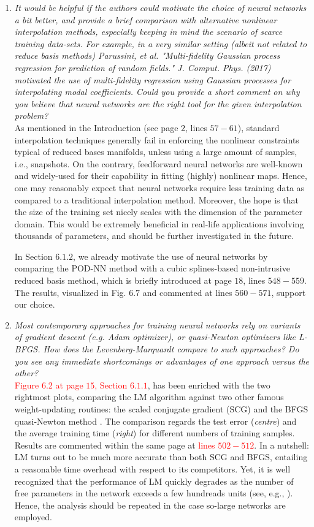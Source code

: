 \documentclass[longtitle]{elsarticle}
\theoremstyle{theorem}
\theoremstyle{definition}
\theoremstyle{remark}
\theoremstyle{proposition}
\numberwithin{figure}{section}
\begin{document}
\begin{enumerate}
			\item \emph{It would be helpful if the authors could motivate the choice of neural networks a bit better, and provide a brief comparison with alternative nonlinear interpolation methods, especially keeping in mind the scenario of scarce training data-sets. For example, in a very similar setting (albeit not related to reduce basis methods) Parussini, et al. "Multi-fidelity Gaussian process regression for prediction of random fields." J. Comput. Phys. (2017) motivated the use of multi-fidelity regression using Gaussian processes for interpolating modal coefficients. Could you provide a short comment on why you believe that neural networks are the right tool for the given interpolation problem?} \\[0.3cm]
			As mentioned in the Introduction (see page $2$, lines $57-61$), standard interpolation techniques generally fail in enforcing the nonlinear constraints typical of reduced bases manifolds, unless using a large amount of samples, i.e., snapshots. On the contrary, feedforward neural networks are well-known and widely-used for their capability in fitting (highly) nonlinear maps. Hence, one may reasonably expect that neural networks require less training data as compared to a traditional interpolation method. Moreover, the hope is that the size of the training set nicely scales with the dimension of the parameter domain. This would be extremely beneficial in real-life applications involving thousands of parameters, and should be further investigated in the future.

			In Section $6.1.2$, we already motivate the use of neural networks by comparing the POD-NN method with a cubic splines-based non-intrusive reduced basis method, which is briefly introduced at page $18$, lines $548-559$. The results, visualized in Fig. $6.7$ and commented at lines $560-571$, support our choice.
			
			\item \emph{Most contemporary approaches for training neural networks rely on variants of gradient descent (e.g. Adam optimizer), or quasi-Newton optimizers like L-BFGS. How does the Levenberg-Marquardt compare to such approaches? Do you see any immediate shortcomings or advantages of one approach versus the other?} \\[0.3cm]
			\textcolor{red}{Figure 6.2 at page $15$, Section $6.1.1$}, has been enriched with the two rightmost plots, comparing the LM algorithm against two other famous weight-updating routines: the scaled conjugate gradient (SCG) \cite{Mol93} and the BFGS quasi-Newton method \cite{GMW81}. The comparison regards the test error (\emph{centre}) and the average training time (\emph{right}) for different numbers of training samples. Results are commented within the same page at \textcolor{red}{lines $502-512$}. In a nutshell: LM turns out to be much more accurate than both SCG and BFGS, entailing a reasonable time overhead with respect to its competitors. Yet, it is well recognized that the performance of LM quickly degrades as the number of free parameters in the network exceeds a few hundreads units (see, e.g., \cite{Hag96}). Hence, the analysis should be repeated in the case so-large networks are employed.


\end{enumerate}
\end{document}
